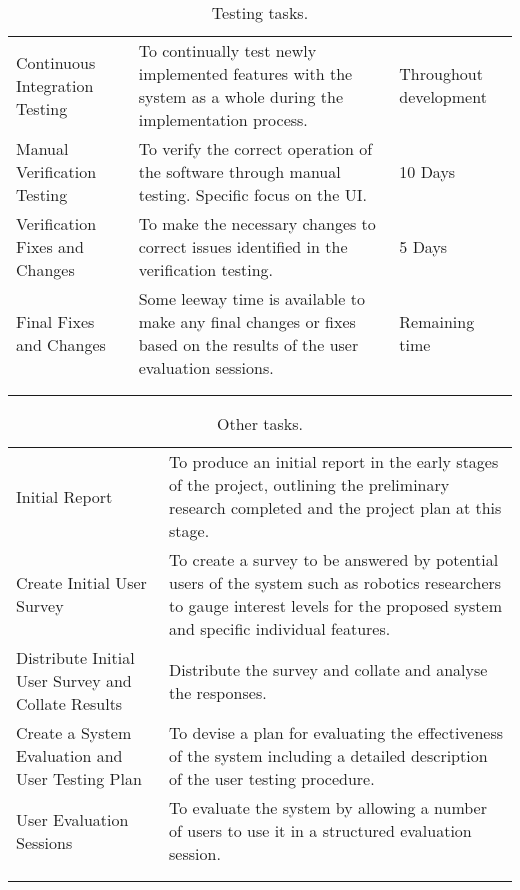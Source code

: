 \begin{longtable}{ >{\raggedright}p{5cm}>{\raggedright}p{6cm}p{3cm} }
	\caption{Testing tasks.}\\
	\toprule
	\tabhead{Task} & \tabhead{Objective} & \tabhead{Approximate Time} \\
	\midrule
	
Continuous Integration Testing & To continually test newly implemented features with the system as a whole during the implementation process. & Throughout development
\\
Manual Verification Testing & To verify the correct operation of the software through manual testing. Specific focus on the UI. & 10 Days
\\
Verification Fixes and Changes & To make the necessary changes to correct issues identified in the verification testing. & 5 Days
\\ 
Final Fixes and Changes & Some leeway time is available to make any final changes or fixes based on the results of the user evaluation sessions. & Remaining time 
\\ 
	\bottomrule\\
	\label{tab:TestingTasks}
\end{longtable}

\clearpage
\begin{longtable}{ p{5cm}p{9cm} }
	\caption{Other tasks.}\\
	\toprule
	\tabhead{Task} & \tabhead{Objective} \\
	\midrule
	
Initial Report & To produce an initial report in the early stages of the project, outlining the preliminary research completed and the project plan at this stage.
\\
Create Initial User Survey & To create a survey to be answered by potential users of the system such as robotics researchers to gauge interest levels for the proposed system and specific individual features.
\\
Distribute Initial User Survey and Collate Results & Distribute the survey and collate and analyse the responses.
\\
Create a System Evaluation and User Testing Plan & To devise a plan for evaluating the effectiveness of the system including a detailed description of the user testing procedure.
\\
User Evaluation Sessions & To evaluate the system by allowing a number of users to use it in a structured evaluation session.
\\
	\bottomrule\\
	\label{tab:OtherTasks}
\end{longtable}

